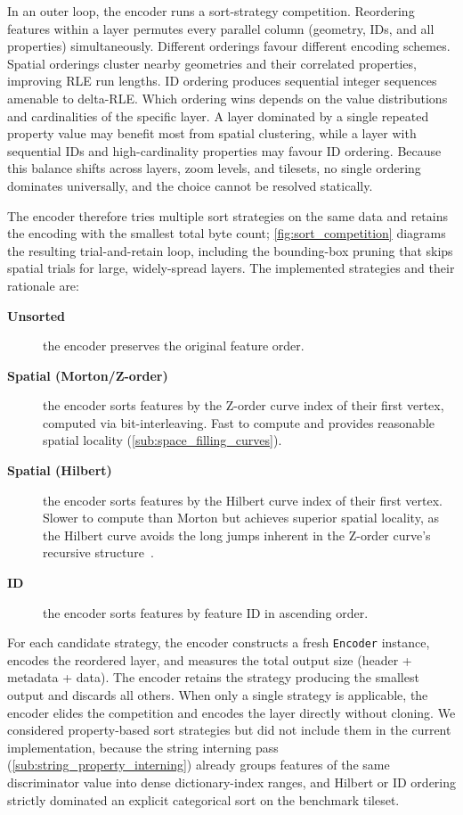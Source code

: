 {In an outer loop, the encoder runs a sort-strategy competition.
Reordering features within a layer permutes every parallel column (geometry, IDs, and all properties) simultaneously.
Different orderings favour different encoding schemes.
Spatial orderings cluster nearby geometries and their correlated properties, improving \ac{RLE} run lengths.
ID ordering produces sequential integer sequences amenable to delta-\acs{RLE}.
Which ordering wins depends on the value distributions and cardinalities of the specific layer.
A layer dominated by a single repeated property value may benefit most from spatial clustering, while a layer with sequential IDs and high-cardinality properties may favour ID ordering.
Because this balance shifts across layers, zoom levels, and tilesets, no single ordering dominates universally, and the choice cannot be resolved statically.

The encoder therefore tries multiple sort strategies on the same data and retains the encoding with the smallest total byte count; \cref{fig:sort_competition} diagrams the resulting trial-and-retain loop, including the bounding-box pruning that skips spatial trials for large, widely-spread layers.
The implemented strategies and their rationale are:

\begin{description}
    \item[\textbf{Unsorted}] the encoder preserves the original feature order.
    \item[\textbf{Spatial (Morton/Z-order)}] the encoder sorts features by the Z-order curve index of their first vertex, computed via bit-interleaving.  Fast to compute and provides reasonable spatial locality (\cref{sub:space_filling_curves}).
    \item[\textbf{Spatial (Hilbert)}] the encoder sorts features by the Hilbert curve index of their first vertex.  Slower to compute than Morton but achieves superior spatial locality, as the Hilbert curve avoids the long jumps inherent in the Z-order curve's recursive structure~\cite{moonAnalysisClusteringProperties2001}.
    \item[\textbf{ID}] the encoder sorts features by feature ID in ascending order.
\end{description}

For each candidate strategy, the encoder constructs a fresh \texttt{Encoder} instance, encodes the reordered layer, and measures the total output size (header + metadata + data).
The encoder retains the strategy producing the smallest output and discards all others.
When only a single strategy is applicable, the encoder elides the competition and encodes the layer directly without cloning.
We considered property-based sort strategies but did not include them in the current implementation, because the string interning pass (\cref{sub:string_property_interning}) already groups features of the same discriminator value into dense dictionary-index ranges, and Hilbert or ID ordering strictly dominated an explicit categorical sort on the benchmark tileset.

}
